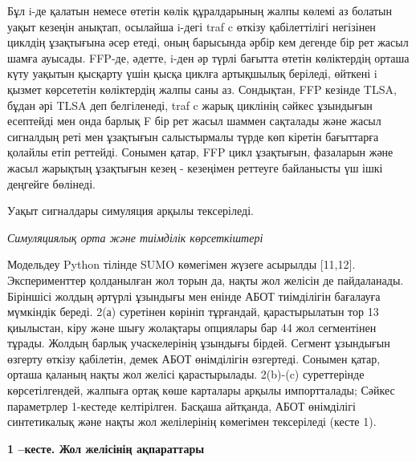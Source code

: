 Бұл i-де қалатын немесе өтетін көлік құралдарының жалпы көлемі аз
болатын уақыт кезеңін анықтап, осылайша i-дегі traf c өткізу
қабілеттілігі негізінен циклдің ұзақтығына әсер етеді, оның барысында
әрбір кем дегенде бір рет жасыл шамға ауысады. FFP-де, әдетте, i-ден әр
түрлі бағытта өтетін көліктердің орташа күту уақытын қысқарту үшін қысқа
циклға артықшылық беріледі, өйткені i қызмет көрсететін көліктердің
жалпы саны аз. Сондықтан, FFP кезінде TLSA, бұдан әрі TLSA деп
белгіленеді, traf c жарық циклінің сәйкес ұзындығын есептейді мен онда
барлық F бір рет жасыл шаммен сақталады және жасыл сигналдың реті мен
ұзақтығын салыстырмалы түрде көп кіретін бағыттарға қолайлы етіп
реттейді. Сонымен қатар, FFP цикл ұзақтығын, фазаларын және жасыл
жарықтың ұзақтығын кезең - кезеңімен реттеуге байланысты үш ішкі
деңгейге бөлінеді.

Уақыт сигналдары симуляция арқылы тексеріледі.

\emph{Симуляциялық орта және тиімділік көрсеткіштері}

Модельдеу Python тілінде SUMO көмегімен жүзеге асырылды {[}11,12{]}.
Эксперименттер қолданылған жол торын да, нақты жол желісін де
пайдаланады. Біріншісі жолдың әртүрлі ұзындығы мен енінде АБОТ
тиімділігін бағалауға мүмкіндік береді. 2(а) суретінен көрініп
тұрғандай, қарастырылатын тор 13 қиылыстан, кіру және шығу жолақтары
опциялары бар 44 жол сегментінен тұрады. Жолдың барлық учаскелерінің
ұзындығы бірдей. Сегмент ұзындығын өзгерту өткізу қабілетін, демек АБОТ
өнімділігін өзгертеді. Сонымен қатар, орташа қаланың нақты жол желісі
қарастырылады. 2(b)-(c) суреттерінде көрсетілгендей, жалпыға ортақ көше
карталары арқылы импортталады; Сәйкес параметрлер 1-кестеде келтірілген.
Басқаша айтқанда, АБОТ өнімділігі синтетикалық және нақты жол
желілерінің көмегімен тексеріледі (кесте 1).

{\bfseries 1 --кесте. Жол желісінің ақпараттары}

